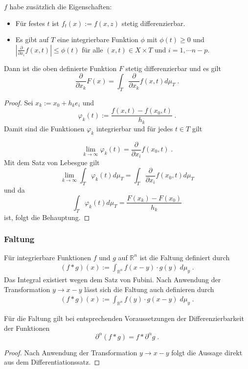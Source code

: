 \begin{Satz}[Differentiationssatz]
$f$ habe zusätzlich die Eigenschaften:
\begin{itemize}
\item Für festes $t$ ist $f_t(x):= f(x,z)$ stetig differenzierbar.
\item Es gibt auf $T$ eine integrierbare Funktion $\phi$ mit $\phi(t) \geq 0$ und $| \frac{\partial}{\partial x_i} f(x,t)| \leq \phi(t)$ für alle $(x,t) \in X \times T$ und $i=1, \cdots n-p$.
\end{itemize}
Dann ist die oben definierte Funktion $F$ stetig differenzierbar und es gilt
$$\frac{\partial}{\partial x_k} F(x)  = \int_T \frac{\partial}{\partial x_k} f(x,t) d \mu_T \; .$$ 
\end{Satz}
\begin{proof}
Sei $x_k := x_0 + h_k e_i$ und 
$$ \varphi_k (t) := \frac{f(x,t)  - f(x_0,t)  }{h_k} \; .$$
Damit sind die Funktionen  $\varphi_k $ integrierbar und für jedes $t \in T$ gilt

$$  \lim_{k \to \infty} \varphi_k (t) = \frac{\partial}{\partial x_i}f(x_0, t) \; .$$
Mit dem Satz von Lebesgue gilt
$$ \lim_{k \to \infty}  \int_T \varphi_k (t) d \mu_T = \int_T   \frac{\partial}{\partial x_i}f(x_0, t) d \mu_T $$
und da 
$$  \int_T \varphi_k (t) d \mu_T = \frac{F(x_k) -F(x_0)}{h_k}$$ ist, folgt die Behauptung.
 
\end{proof}




\subsubsection{Faltung}
\begin{Definition}
Für integrierbare Funktionen  $f$ und $g$ auf $\mathbb{R}^n$ ist die Faltung definiert durch
\begin{align}
(f * g )(x) := \int_{\mathbb{R}^n}  f(x- y) \cdot g(y) \; d \mu_y  \; .
\end{align}
Das Integral existiert wegen dem Satz von Fubini.  Nach Anwendung der Transformation $y \to x -y$ lässt sich die Faltung auch definieren durch  
\begin{align}
(f * g )(x) := \int_{\mathbb{R}^n}  f(y) \cdot g(x-y) \; d \mu_y  \; .
\end{align}
\end{Definition}

\begin{Satz}
Für die Faltung gilt bei entsprechenden Voraussetzungen der Differenzierbarkeit der Funktionen 
$$ \partial^{\alpha} (f  * g) = f * \partial^{\alpha} g \; .$$
\end{Satz}
\begin{proof}
Nach Anwendung der Transformation $y \to x -y$ folgt die Aussage direkt aus dem Differentiationssatz.
\end{proof}
